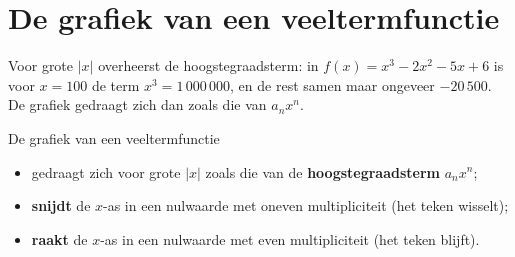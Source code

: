 \begin{oefeningen}


\end{oefeningen}

\section{De grafiek van een veeltermfunctie}

Voor grote $|x|$ overheerst de hoogstegraadsterm: in $f(x) = x^3 - 2x^2 - 5x + 6$ is voor $x = 100$ de term $x^3 = 1\,000\,000$, en de rest samen maar ongeveer $-20\,500$. De grafiek gedraagt zich dan zoals die van $a_n x^n$.

\begin{theorie}
De grafiek van een veeltermfunctie
\begin{itemize}
\item gedraagt zich voor grote $|x|$ zoals die van de \textbf{\textcolor{accent}{hoogstegraadsterm}} $a_n x^n$;
\item \textbf{\textcolor{accent}{snijdt}} de $x$-as in een nulwaarde met oneven multipliciteit (het teken wisselt);
\item \textbf{\textcolor{accent}{raakt}} de $x$-as in een nulwaarde met even multipliciteit (het teken blijft).
\end{itemize}
\end{theorie}


